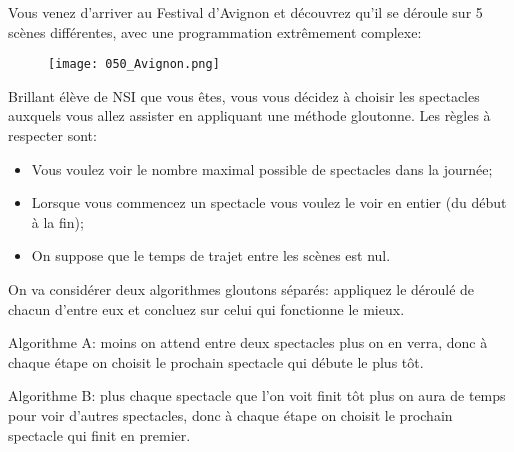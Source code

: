 \documentclass[12pt]{article}
\begin{document}
	\begin{MonExo}
		Vous venez d'arriver au Festival d'Avignon et découvrez qu'il se déroule sur 5 scènes différentes, avec une programmation extrêmement complexe:
		\begin{figure}[H]
			\centering
			\texttt{[image: 050\_Avignon.png]}
		\end{figure}
		Brillant élève de NSI que vous êtes, vous vous décidez à choisir les spectacles auxquels vous allez assister en appliquant une méthode gloutonne. Les règles à respecter sont:
		\begin{itemize}
			\item Vous voulez voir le nombre maximal possible de spectacles dans la journée;
			\item Lorsque vous commencez un spectacle vous voulez le voir en entier (du début à la fin);
			\item On suppose que le temps de trajet entre les scènes est nul.
		\end{itemize}
		
		On va considérer deux algorithmes gloutons séparés: appliquez le déroulé de chacun d'entre eux et concluez sur celui qui fonctionne le mieux.
		\begin{alphenum}
			\item Algorithme A: moins on attend entre deux spectacles plus on en verra, donc à chaque étape on choisit le prochain spectacle qui débute le plus tôt.
			\item Algorithme B: plus chaque spectacle que l'on voit finit tôt plus on aura de temps pour voir d'autres spectacles, donc à chaque étape on choisit le prochain spectacle qui finit en premier.
		\end{alphenum}
	\end{MonExo}
\end{document}

